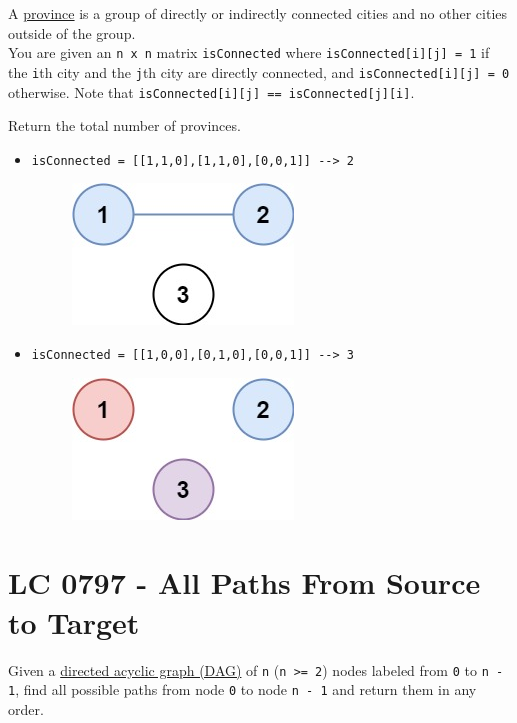 A \ul{province} is a group of directly or indirectly connected cities and no other cities outside of the group.\\

You are given an {\colorbox{CodeBackground}{\lstinline|n x n|}} matrix {\colorbox{CodeBackground}{\lstinline|isConnected|}} where {\colorbox{CodeBackground}{\lstinline|isConnected[i][j] = 1|}} if the {\colorbox{CodeBackground}{\lstinline|i|}}th city and the {\colorbox{CodeBackground}{\lstinline|j|}}th city are directly connected, and {\colorbox{CodeBackground}{\lstinline|isConnected[i][j] = 0|}} otherwise. Note that {\colorbox{CodeBackground}{\lstinline|isConnected[i][j] == isConnected[j][i]|}}.

Return the total number of provinces.

\begin{itemize}
\item {\colorbox{CodeBackground}{\lstinline|isConnected = [[1,1,0],[1,1,0],[0,0,1]] --> 2|}}
\begin{figure}[H]
\centering
\includegraphics[width=0.15\linewidth]{images/lc0547_eg1}
\end{figure}
\item {\colorbox{CodeBackground}{\lstinline|isConnected = [[1,0,0],[0,1,0],[0,0,1]] --> 3|}}
\begin{figure}[H]
\centering
\includegraphics[width=0.15\linewidth]{images/lc0547_eg2}
\end{figure}
\end{itemize}

\section{LC 0797 - All Paths From Source to Target}
Given a \ul{directed acyclic graph (DAG)} of {\colorbox{CodeBackground}{\lstinline|n|}} ({\colorbox{CodeBackground}{\lstinline|n >= 2|}}) nodes labeled from {\colorbox{CodeBackground}{\lstinline|0|}} to {\colorbox{CodeBackground}{\lstinline|n - 1|}}, find all possible paths from node {\colorbox{CodeBackground}{\lstinline|0|}} to node {\colorbox{CodeBackground}{\lstinline|n - 1|}} and return them in any order.\\

